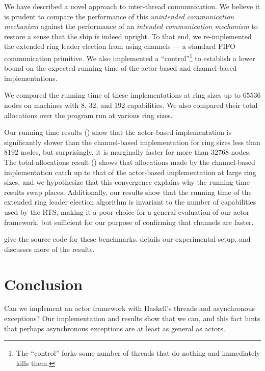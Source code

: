 \documentclass[sigplan,screen]{acmart}
\begin{document}
We have described a novel approach to inter-thread communication.
%
We believe it
is prudent to compare the performance of this \emph{unintended communication
mechanism} against the performance of an \emph{intended communication
mechanism} to restore a sense that the ship is indeed upright.
%
To that end,
we re-implemented the extended ring leader election from 
using channels --- a standard FIFO communication primitive.
%
We also implemented a ``control''\footnote{
    The ``control'' forks some number of threads that do nothing and
    immediately kills them.
} to establish a lower bound on the expected
running time of the actor-based and channel-based implementations.

%
We compared the running time of these implementations
at ring sizes up to $65536$ nodes on machines with 8, 32, and 192
capabilities.
%
We also compared their total allocations over the program run at various ring
sizes.

%
Our running time results () show that
the actor-based implementation is significantly slower
than the channel-based implementation for ring sizes less than $8192$ nodes,
but surprisingly, it is marginally faster for more than $32768$ nodes.
%
The total-allocations result () shows that
allocations made by the channel-based implementation
catch up to that of the actor-based implementation at large ring sizes,
and we hypothesize that this convergence
explains why the running time results swap places.
%
Additionally, our results show that the running time of the extended ring leader
election algorithm is invariant to the number of capabilities used by the RTS,
making it a poor choice for a general evaluation of our actor framework,
but sufficient for our purpose of confirming that channels are faster.

give the source code for these benchmarks.
 details our experimental setup, and
 discusses more of the results.




\section{Conclusion}
\label{sec:conclusion}

Can we implement an actor framework with Haskell's threads and asynchronous
exceptions?
%
Our implementation and results show that we can, and this fact hints that
perhaps asynchronous exceptions are at least as general as actors.
\end{document}
